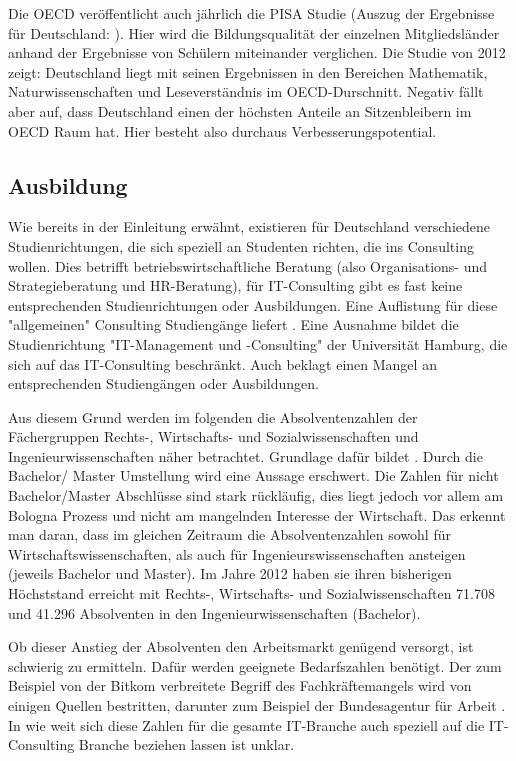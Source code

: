 Die OECD veröffentlicht auch jährlich die PISA Studie (Auszug der Ergebnisse für Deutschland: \cite{pisa} ). Hier wird die Bildungsqualität der einzelnen Mitgliedsländer anhand der Ergebnisse von Schülern miteinander verglichen. Die Studie von 2012 zeigt: Deutschland liegt mit seinen Ergebnissen in den Bereichen Mathematik, Naturwissenschaften und Leseverständnis im OECD-Durschnitt. Negativ fällt aber auf, dass Deutschland einen der höchsten Anteile an Sitzenbleibern im OECD Raum hat. Hier besteht also durchaus Verbesserungspotential.

\subsection{Ausbildung}
Wie bereits in der Einleitung erwähnt, existieren für Deutschland verschiedene Studienrichtungen, die sich speziell an Studenten richten, die ins Consulting wollen. Dies betrifft betriebswirtschaftliche Beratung (also Organisations- und Strategieberatung und HR-Beratung), für IT-Consulting gibt es fast keine entsprechenden Studienrichtungen oder Ausbildungen.
Eine Auflistung für diese "allgemeinen" Consulting Studiengänge liefert \cite{NissenKlaukDeelmannMohe201209}. 
Eine Ausnahme bildet die Studienrichtung "IT-Management und -Consulting" der Universität Hamburg, die sich auf das IT-Consulting beschränkt. Auch \cite{IDSScheer} beklagt einen Mangel an entsprechenden Studiengängen oder Ausbildungen.

Aus diesem Grund werden im folgenden die Absolventenzahlen der Fächergruppen Rechts-, Wirtschafts- und Sozialwissenschaften und Ingenieurwissenschaften näher betrachtet.
Grundlage dafür bildet \cite{absolventen} . Durch die Bachelor/ Master Umstellung wird eine Aussage erschwert. Die Zahlen für nicht Bachelor/Master Abschlüsse sind stark rückläufig, dies liegt jedoch vor allem am Bologna Prozess und nicht am mangelnden Interesse der Wirtschaft. Das erkennt man daran, dass im gleichen Zeitraum die Absolventenzahlen sowohl für Wirtschaftswissenschaften, als auch für Ingenieurswissenschaften ansteigen (jeweils Bachelor und Master). Im Jahre 2012 haben sie ihren bisherigen Höchststand erreicht mit Rechts-, Wirtschafts- und Sozialwissenschaften 71.708 und 41.296 Absolventen in den Ingenieurwissenschaften (Bachelor).

Ob dieser Anstieg der Absolventen den Arbeitsmarkt genügend versorgt, ist schwierig zu ermitteln. Dafür werden geeignete Bedarfszahlen benötigt. Der zum Beispiel von der Bitkom verbreitete Begriff \cite{fachkraft} des Fachkräftemangels wird von einigen Quellen bestritten, darunter zum Beispiel der Bundesagentur für Arbeit \cite{fachkraftnein}. In wie weit sich diese Zahlen für die gesamte IT-Branche auch speziell auf die IT-Consulting Branche beziehen lassen ist unklar.

